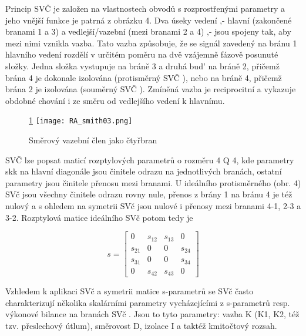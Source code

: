         Princip SVČ je založen na vlastnostech obvodů s rozprostřenými parametry a jeho vnější 
        funkce je patrná z obrázku 4. Dva úseky vedení ‚- hlavní (zakončené branami 1 a 3) a 
        vedlejší/vazební (mezi branami 2 a 4) ‚- jsou spojeny tak, aby mezi nimi vznikla vazba. 
        Tato vazba způsobuje, že se signál zavedený na bránu 1 hlavního vedení rozdělí v určitém 
        poměru na dvě vzájemně fázově posunuté složky. Jedna složka vystupuje na bráně 3 a druhá 
        bud’ na bráně 2, přičemž brána 4 je dokonale izolována (protisměrný SVČ ), nebo na bráně 4, 
        přičemž brána 2 je izolována (souměrný SVČ ). Zmíněná vazba je reciprocitní a vykazuje 
        obdobné chování i ze směru od vedlejšího vedení k hlavnímu.      
  
        \begin{figure}\ref{fyz:fig0_RA_smith03} 
          \centering
          \texttt{[image: RA\_smith03.png]}
          \caption{Směrový vazební člen jako čtyřbran}
          \label{fyz:fig0_RA_smith03} 
        \end{figure}
  
        SVČ lze popsat maticí rozptylových parametrů o rozměru 4 Q 4, kde parametry skk na hlavní 
        diagonále jsou činitele odrazu na jednotlivých branách, ostatní parametry jsou činitele 
        přenosu mezi branami. U ideálního protisměrného (obr. 4) SVč jsou všechny činitele odrazu 
        rovny nule, přenos z brány 1 na bránu 4 je též nulový a s ohledem na symetrii SVč jsou 
        nulové i přenosy mezi branami 4-1, 2-3 a 3-2. Rozptylová matice ideálního SVč potom tedy je
  
        \begin{equation}\label{RA:eq_smith09}
          s = \left[
            \begin{matrix}
                0    & s_{12} & s_{13} &  0       \\
              s_{21} &   0    &   0    & s_{24}   \\
              s_{31} &   0    &   0    & s_{34}   \\
                0    & s_{42} & s_{43} &  0     
            \end{matrix}
              \right]
        \end{equation} 
  
        Vzhledem k aplikaci SVč a symetrii matice s-parametrů se SVč často charakterizují několika 
        skalárními parametry vycházejícími z s-parametrů resp. výkonové bilance na branách SVč . 
        Jsou to tyto parametry: vazba K (K1, K2, též tzv. přeslechový útlum), směrovost D, izolace 
        I a taktéž kmitočtový rozsah.
  
